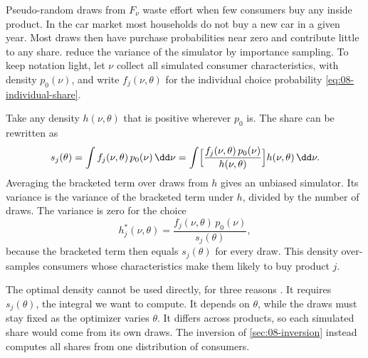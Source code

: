 Pseudo-random draws from $F_\nu$ waste effort when few consumers buy any inside product. In the car market most
households do not buy a new car in a given year. Most draws then have purchase probabilities near zero and
contribute little to any share. \citet[Section~6.3]{BerryLevinsohnPakes1995} reduce the variance of the simulator by
importance sampling. To keep notation light, let $\nu$ collect all simulated consumer characteristics, with density
$p_0(\nu)$, and write $f_j(\nu, \theta)$ for the individual choice probability \eqref{eq:08-individual-share}.

Take any density $h(\nu, \theta)$ that is positive wherever $p_0$ is. The share can be rewritten as
\citep[eq.~(6.11)]{BerryLevinsohnPakes1995}
\begin{equation}\label{eq:08-importance-identity}
  s_j(\theta) = \int f_j(\nu, \theta)\, p_0(\nu)\, \dd\nu
  = \int \Bigl[\frac{f_j(\nu, \theta)\, p_0(\nu)}{h(\nu, \theta)}\Bigr] h(\nu, \theta)\, \dd\nu.
\end{equation}
Averaging the bracketed term over draws from $h$ gives an unbiased simulator. Its variance is the variance of the
bracketed term under $h$, divided by the number of draws. The variance is zero for the choice
\citep[eq.~(6.12)]{BerryLevinsohnPakes1995}
\begin{equation}\label{eq:08-optimal-importance}
  h^*_j(\nu, \theta) = \frac{f_j(\nu, \theta)\, p_0(\nu)}{s_j(\theta)},
\end{equation}
because the bracketed term then equals $s_j(\theta)$ for every draw. This density over-samples consumers whose
characteristics make them likely to buy product $j$.

The optimal density cannot be used directly, for three reasons \citep[pp.~866--867]{BerryLevinsohnPakes1995}. It
requires $s_j(\theta)$, the integral we want to compute. It depends on $\theta$, while the draws must stay fixed as
the optimizer varies $\theta$. It differs across products, so each simulated share would come from its own draws.
The inversion of \cref{sec:08-inversion} instead computes all shares from one distribution of consumers.


